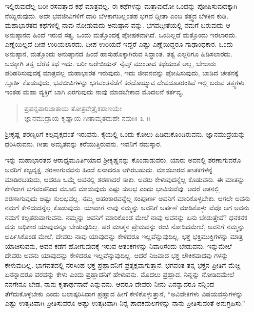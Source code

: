 ಇಲ್ಲಿರುವುದೆಲ್ಲ ಬರೀ ರಸವತ್ತಾದ ಕಥೆ ಮಾತ್ರವಲ್ಲ. ಈ ಕಥೆಗಳನ್ನು ಮತ್ತಾವುದೋ ಒಂದನ್ನು ಪೋಷಿಸುವುದಕ್ಕಾಗಿ ನೆಯ್ದಿರುವುದು. ಅದೇ ಭವಜೀವಿಗಳಿಗೆ ದಾರಿ ಬೆಳಕಾಗಬಲ್ಲಂತಹ ಭಗವ ದ್ಗೀತಾ ಎಂಬ ತತ್ತ್ವದ ಬೆಳಕಿನ ಕುಡಿ. ಮಹಾಭಾರತದ ಕಥೆಗಳಲ್ಲಿ ನಾವು ನೋಡುವುದು ಅನುಷ್ಠಾನ ವನ್ನು. ಭಗವದ್ಗೀತೆಯಲ್ಲಿ ನಮಗೆ ಬರುವುದು ಆ ಅನುಷ್ಠಾನದ ಹಿಂದೆ ಇರುವ ಸತ್ಯ. ಒಂದು ಮತ್ತೊಂದಕ್ಕೆ ಪೋಷಕವಾಗಿದೆ. ಒಂದಿಲ್ಲದೆ ಮತ್ತೊಂದು ಇರಲಾರದು. ಎಣ್ಣೆಯಿಲ್ಲದೆ ದೀಪ ಉರಿಯಲಾರದು. ದೀಪ ಉರಿಯದೆ ಇದ್ದರೆ ಎಷ್ಟು ಎಣ್ಣೆಯಿದ್ದರೂ ಗಾಢಾಂಧಕಾರ. ಒಂದು ಅನುಷ್ಠಾನ, ಮತ್ತೊಂದು ಅನುಷ್ಠಾನದ ಹಿಂದೆ ಹಾಸುಹೊಕ್ಕಾಗಿರುವ ಸಿದ್ಧಾಂತ. ತತ್ವ ಎಲ್ಲರಿಗೂ ಹಿಡಿಸಲಾರದು. ಅದಕ್ಕಾಗಿ ತತ್ವ ಬೆರೆತ ಕಥೆ ಇದು. ಬರೀ ಅರೇಬಿಯನ್ ನೈಟ್ಸ್ ಮುಂತಾದ ಕಥೆಯಂತೆ ಅಲ್ಲ, ಬೇಜಾರು ಪರಿಹರಿಸುವುದಕ್ಕೆ ಮಾತ್ರವಲ್ಲ ಮಹಾಭಾರತ ಇರುವುದು, ಇದು ಜೀವನವನ್ನು ಪೋಷಿಸುವುದು, ಬಾಡಿದ ಚೇತನಕ್ಕೆ ಸ್ಫೂರ್ತಿ ಕೊಡುವುದು, ಭವಜೀವಿಗಳನ್ನು ಭಗವಂತನೆಡೆಗೆ ಕರೆದೊಯ್ಯುವ ದೇವದೂತರಂತಿವೆ ಇಲ್ಲಿ ಬರುವ ತತ್ತ್ವಗಳು. ಇಂತಹ ಮಹಾ ವ್ಯಕ್ತಿಗೆ ಬಾಗಿ ಎರಗುವುದು ನಾವು ಮಾಡಬೇಕಾದ ಮೊದಲನೆ ಕರ್ತವ್ಯ.

\begin{verse}
ಪ್ರಪನ್ನಪಾರಿಜಾತಾಯ ತೋತ್ರವೇತ್ರೈಕಪಾಣಯೇ\\ಜ್ಞಾನಮುದ್ರಾಯ ಕೃಷ್ಣಾಯ ಗೀತಾಮೃತದುಹೇ ನಮಃ\num{॥ ೩ ॥}
\end{verse}

{\small ಶ್ರೀಕೃಷ್ಣ ಶರಣ್ಯರಿಗೆ ಕಲ್ಪವೃಕ್ಷದಂತೆ ಇರುವನು. ಕೈಯಲ್ಲಿ ಒಂದು ಕೋಲು ಹಿಡಿದುಕೊಂಡಿರುವನು. ಜ್ಞಾನಮುದ್ರೆಯನ್ನು ಧರಿಸಿರುವನು. ಗೀತಾ ಅಮೃತವನ್ನು ಕರೆಯುತ್ತಿರುವನು. ಇವನಿಗೆ ನಮಸ್ಕಾರ.}

ಇನ್ನು ಮಹಾಭಾರತದ ಆರಾಧ್ಯಮೂರ್ತಿಯಾದ ಶ್ರೀಕೃಷ್ಣನನ್ನು ಕೊಂಡಾಡುವರು. ಯಾರು ಅವನಲ್ಲಿ ಶರಣಾಗುವರೊ ಅವರಿಗೆ ಕಲ್ಪವೃಕ್ಷ. ಶರಣಾಗುವವನು ಹಿಂದೆ ಏನಾದರೂ ಆಗಿರಬಹುದು. ಮಾಡಬಾರದ ಪಾತಕಗಳನ್ನೆ ಮಾಡಿರಬಹುದು, ಆದರೂ ಒಮ್ಮೆ ಅವನಲ್ಲಿ ಶರಣಾದರೆ ಸಾಕು. ಅವರು ಕೇಳುವುದನ್ನೆಲ್ಲ ಕೊಡುವನು. ಈ ಮಾತನ್ನು ಕೇಳಿದಾಗ ಭಗವಂತನಿಂದ ವಸೂಲಿ ಮಾಡುವುದು ಎಷ್ಟು ಸುಲಭ ಎಂದು ಭಾವಿಸುವೆವು. ಆದರೆ ಆತನಲ್ಲಿ ಶರಣಾಗುವುದು ಅಷ್ಟು ಸುಲಭವಲ್ಲ. ನಮ್ಮ ಅಹಂಕಾರವನ್ನೆಲ್ಲ ಸಂಪೂರ್ಣ ಅವನಿಗೆ ಮಾರಿಕೊಳ್ಳಬೇಕು. ಆಗಲೇ ಅವನು ನಮಗೆ ಕೇಳಿದುದನ್ನೆಲ್ಲ ಕೊಡುವುದು. ಯಾವಾಗ ನಾವು ನಮ್ಮನ್ನು ಅವನಿಗೆ ಅರ್ಪಣೆ ಮಾಡಿಕೊಳ್ಳು ವೆವೊ ಆಗ ಅವನು ನಮಗೆ ಕಲ್ಪತರುವಾಗುವನು. ನಮ್ಮನ್ನು ಅವನಿಗೆ ಮಾರಿಕೊಂಡ ಮೇಲೆ ನಾವು ಅವನನ್ನು ಏನು ಬೇಡುತ್ತೇವೆ? ಧನಕನಕ ವಸ್ತು ಅಧಿಕಾರ ಯಾವುದನ್ನೂ ಬೇಡುವುದಿಲ್ಲ. ಪರ ಮಾತ್ಮನ ಪ್ರೇಮವನ್ನು ರುಚಿ ನೋಡಿದಮೇಲೆ, ಅವನಿಗೆ ನಮ್ಮನ್ನು ಅರ್ಪಿಸಿಕೊಂಡ ಮೇಲೆ, ದೇವರು ನಾವು ಯಾವುದನ್ನು ಕೇಳಿದರೂ ಇಲ್ಲವೆನ್ನುವುದಿಲ್ಲ. ಭಕ್ತ ಭಕ್ತಿಮುಕ್ತಿಗಳನ್ನು ಮಾತ್ರ ಯಾಚಿಸುವನು, ಅವನ ಕಡೆಗೆ ಹೋಗುವುದಕ್ಕೆ ಇರುವ ಆತಂಕಗಳನ್ನು ನಿವಾರಿಸೆಂದು ಬೇಡುವನು. ಇನ್ನುಮೇಲೆ ದೇವರು ಅವನು ಯಾವುದನ್ನು ಕೇಳಿದರೂ ಇಲ್ಲವೆನ್ನುವುದಿಲ್ಲ. ಆದರೆ ನಿಜವಾದ ಭಕ್ತ ಲೌಕಿಕವಾದವು ಗಳನ್ನು ಕೇಳುವುದಿಲ್ಲ. ಭಾಗವತದಲ್ಲಿ ನರಸಿಂಹ ಭಕ್ತ ಪ್ರಹ್ಲಾದನಿಗೆ ಪ್ರತ್ಯಕ್ಷವಾಗುತ್ತಾನೆ. ಭಗವಂತ ತನ್ನ ಭಕ್ತನ ಪ್ರೀತಿಗೆ ಮೆಚ್ಚಿ ಏನನ್ನಾದರೂ ವರವನ್ನು ಕೇಳು ಎಂದು ಪ್ರಹ್ಲಾದನಿಗೆ ಹೇಳುವನು. ಮೊದಲು ಪ್ರಹ್ಲಾದ, ನಿನ್ನನ್ನು ನೋಡಿದಮೇಲೆ ನನಗೇನೂ ಬೇಡ, ನಾನು ಕೃತಾರ್ಥನಾದೆ ಎನ್ನುವನು. ಆದರೂ ದೇವರು ನೀನು ಏನನ್ನಾದರೂ ನನ್ನಿಂದ ತೆಗೆದುಕೊಳ್ಳಬೇಕು ಎಂದು ಬಲಾತ್ಕರಿಸಿದಾಗ ಪ್ರಹ್ಲಾದ ಹೀಗೆ ಕೇಳಿಕೊಳ್ಳುತ್ತಾನೆ, “ಅವಿವೇಕಿಗಳು ವಿಷಯವಸ್ತುಗಳನ್ನು ಎಷ್ಟು ಉತ್ಕಟವಾಗಿ ಪ್ರೀತಿಸುವರೊ ಅಷ್ಟು ಉತ್ಕಟವಾಗಿ ನಿನ್ನ ಪಾದಕಮಲಗಳನ್ನು ನಾನು ಪ್ರೀತಿಸುವಂತೆ ಅನುಗ್ರಹಿಸು.”

